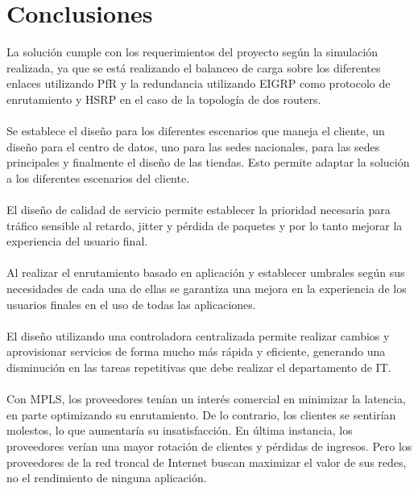 \chapter{Conclusiones}
\label{cha:Conclusiones}

La solución cumple con los requerimientos del proyecto según la simulación realizada, ya que se está realizando el balanceo de carga sobre los diferentes enlaces utilizando PfR y la redundancia utilizando EIGRP como protocolo de enrutamiento y HSRP en el caso de la topología de dos routers.
\\
\\
Se establece el diseño para los diferentes escenarios que maneja el cliente, un diseño para el centro de datos, uno para las sedes nacionales, para las sedes principales y finalmente el diseño de las tiendas. Esto permite adaptar la solución a los diferentes escenarios del cliente.
\\
\\
El diseño de calidad de servicio permite establecer la prioridad necesaria para tráfico sensible al retardo, jitter y pérdida de paquetes y por lo tanto mejorar la experiencia del usuario final.
\\
\\
Al realizar el enrutamiento basado en aplicación y establecer umbrales según sus necesidades de cada una de ellas se garantiza una mejora en la experiencia de los usuarios finales en el uso de todas las aplicaciones.
\\
\\
El diseño utilizando una controladora centralizada permite realizar cambios y aprovisionar servicios de forma mucho más rápida y eficiente, generando una disminución en las tareas repetitivas que debe realizar el departamento de IT.
\\
\\
Con MPLS, los proveedores tenían un interés comercial en minimizar la latencia, en parte optimizando su enrutamiento. De lo contrario, los clientes se sentirían molestos, lo que aumentaría su insatisfacción. En última instancia, los proveedores verían una mayor rotación de clientes y pérdidas de ingresos. Pero los proveedores de la red troncal de Internet buscan maximizar el valor de sus redes, no el rendimiento de ninguna aplicación. 
\\
